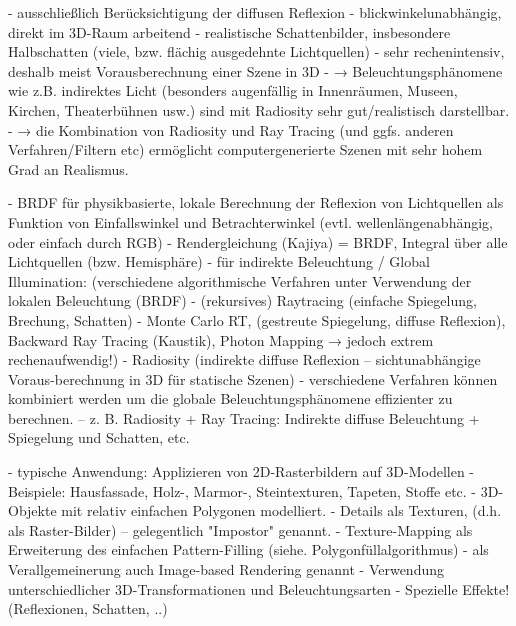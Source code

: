 \documentclass[10pt,landscape]{article}
\makeatletter
\renewcommand{\section}{\@startsection{section}{1}{0mm}%
                                {-1ex plus -.5ex minus -.2ex}%
                                {0.5ex plus .2ex}%
                                {\normalfont\large\bfseries}}
\renewcommand{\subsection}{\@startsection{subsection}{2}{0mm}%
                                {-1explus -.5ex minus -.2ex}%
                                {0.5ex plus .2ex}%
                                {\normalfont\normalsize\bfseries}}
\makeatother
\begin{document}
\begin{multicols}{3}
- ausschließlich Berücksichtigung der diffusen Reflexion
- blickwinkelunabhängig, direkt im 3D-Raum arbeitend
- realistische Schattenbilder, insbesondere Halbschatten (viele, bzw. flächig ausgedehnte Lichtquellen)
- sehr rechenintensiv, deshalb meist Vorausberechnung einer Szene in 3D
- → Beleuchtungsphänomene wie z.B. indirektes Licht (besonders augenfällig in Innenräumen, Museen, Kirchen, Theaterbühnen usw.) sind mit Radiosity sehr gut/realistisch darstellbar.
- → die Kombination von Radiosity und Ray Tracing (und ggfs. anderen Verfahren/Filtern etc) ermöglicht computergenerierte Szenen mit sehr hohem Grad an Realismus.

- BRDF für physikbasierte, lokale Berechnung der Reflexion von Lichtquellen als Funktion von Einfallswinkel und Betrachterwinkel (evtl. wellenlängenabhängig, oder einfach durch RGB) 
- Rendergleichung (Kajiya) = BRDF, Integral über alle Lichtquellen (bzw. Hemisphäre)
- für indirekte Beleuchtung / Global Illumination: (verschiedene algorithmische Verfahren unter Verwendung der lokalen Beleuchtung (BRDF)
  - (rekursives) Raytracing (einfache Spiegelung, Brechung, Schatten)
  - Monte Carlo RT, (gestreute Spiegelung, diffuse Reflexion), Backward Ray Tracing (Kaustik), Photon Mapping → jedoch extrem rechenaufwendig!)
  - Radiosity (indirekte diffuse Reflexion – sichtunabhängige Voraus-berechnung in 3D für statische Szenen)
- verschiedene Verfahren können kombiniert werden um die globale Beleuchtungsphänomene effizienter zu berechnen. – z. B. Radiosity + Ray Tracing: Indirekte diffuse Beleuchtung + Spiegelung und Schatten, etc.

- typische Anwendung: Applizieren von 2D-Rasterbildern auf 3D-Modellen
  - Beispiele: Hausfassade, Holz-, Marmor-, Steintexturen, Tapeten, Stoffe etc.
- 3D-Objekte mit relativ einfachen Polygonen modelliert. - Details als Texturen, (d.h. als Raster-Bilder) – gelegentlich "Impostor" genannt.
- Texture-Mapping als Erweiterung des einfachen Pattern-Filling (siehe. Polygonfüllalgorithmus)
- als Verallgemeinerung auch Image-based Rendering genannt
- Verwendung unterschiedlicher 3D-Transformationen und Beleuchtungsarten
  - Spezielle Effekte! (Reflexionen, Schatten, ..)


\end{multicols}
\end{document}
